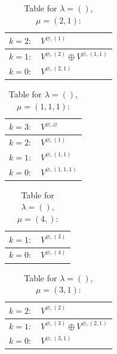 \documentclass[a4paper,12pt]{article}
\begin{document}
\renewcommand{\arraystretch}{1.6} 
\begin{table}[H]
\centering
\caption{Table for $\lambda = ()$, $\mu = (2, 1)$:}
\begin{tabular}{|>{\centering\arraybackslash}p{15cm}|}
\hline
 $k = 2: \quad V^{\varnothing, (1)} $ \\ \hline
 $k = 1: \quad V^{\varnothing, (2)} \oplus V^{\varnothing, (1, 1)} $ \\ \hline
 $k = 0: \quad V^{\varnothing, (2, 1)} $ \\ \hline
\end{tabular}
\end{table}

\renewcommand{\arraystretch}{1.6} 
\begin{table}[H]
\centering
\caption{Table for $\lambda = ()$, $\mu = (1, 1, 1)$:}
\begin{tabular}{|>{\centering\arraybackslash}p{15cm}|}
\hline
 $k = 3: \quad V^{\varnothing, \varnothing} $ \\ \hline
 $k = 2: \quad V^{\varnothing, (1)} $ \\ \hline
 $k = 1: \quad V^{\varnothing, (1, 1)} $ \\ \hline
 $k = 0: \quad V^{\varnothing, (1, 1, 1)} $ \\ \hline
\end{tabular}
\end{table}

\renewcommand{\arraystretch}{1.6} 
\begin{table}[H]
\centering
\caption{Table for $\lambda = ()$, $\mu = (4,)$:}
\begin{tabular}{|>{\centering\arraybackslash}p{15cm}|}
\hline
 $k = 1: \quad V^{\varnothing, (3)} $ \\ \hline
 $k = 0: \quad V^{\varnothing, (4)} $ \\ \hline
\end{tabular}
\end{table}

\renewcommand{\arraystretch}{1.6} 
\begin{table}[H]
\centering
\caption{Table for $\lambda = ()$, $\mu = (3, 1)$:}
\begin{tabular}{|>{\centering\arraybackslash}p{15cm}|}
\hline
 $k = 2: \quad V^{\varnothing, (2)} $ \\ \hline
 $k = 1: \quad V^{\varnothing, (3)} \oplus V^{\varnothing, (2, 1)} $ \\ \hline
 $k = 0: \quad V^{\varnothing, (3, 1)} $ \\ \hline
\end{tabular}
\end{table}
\end{document}
